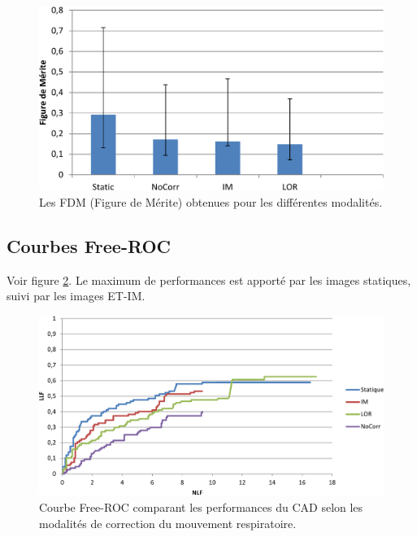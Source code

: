 \begin{figure}[h!]
 \begin{center}
   \includegraphics[width=15cm]{images/FOM_mod19}
 \end{center}
 \caption{Les FDM (Figure de Mérite) obtenues pour les différentes modalités.}
 \label{fig:fom_mod19} 
\end{figure}


\subsection{Courbes Free-ROC}

Voir figure \ref{fig:froc_mod19}.
Le maximum de performances est apporté par les images statiques, suivi par les images ET-IM.

\begin{figure}[h!]
 \begin{center}
   \includegraphics[width=15cm]{images/FROC_mod19}
 \end{center}
 \caption{Courbe Free-ROC comparant les performances du CAD selon les modalités de correction du mouvement respiratoire.}
\label{fig:froc_mod19}
\end{figure}


